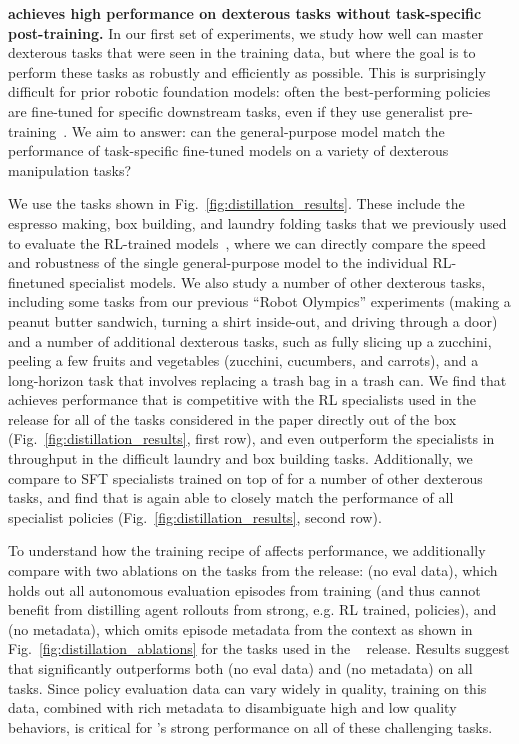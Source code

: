 
\label{sec:dexterity}

\noindent \textbf{\MethodName{} achieves high performance on dexterous tasks without task-specific post-training.}
In our first set of experiments, we study how well \MethodName{} can master dexterous tasks that were seen in the training data, but where the goal is to perform these tasks as robustly and efficiently as possible. This is surprisingly difficult for prior robotic foundation models: often the best-performing policies are fine-tuned for specific downstream tasks, even if they use generalist pre-training~\citep{pistar06, pi06model}. We aim to answer: can the general-purpose \MethodName{} model match the performance of task-specific fine-tuned models on a variety of dexterous manipulation tasks?

We use the tasks shown in Fig.~\ref{fig:distillation_results}. These include the espresso making, box building, and laundry folding tasks that we previously used to evaluate the RL-trained \Piszs{} models~\citep{pistar06}, where we can directly compare the speed and robustness of the single general-purpose \MethodName{} model to the individual RL-finetuned specialist \Piszs{} models. We also study a number of other dexterous tasks, including some tasks from our previous ``Robot Olympics'' experiments (making a peanut butter sandwich, turning a shirt inside-out, and driving through a door) and a number of additional dexterous tasks, such as fully slicing up a zucchini, peeling a few fruits and vegetables (zucchini, cucumbers, and carrots), and a long-horizon task that involves replacing a trash bag in a trash can. We find that \MethodName{} achieves performance that is competitive with the RL specialists used in the \Piszs{} release \citep{pistar06} for all of the tasks considered in the paper directly out of the box (Fig.~\ref{fig:distillation_results}, first row), and even outperform the specialists in throughput in the difficult laundry and box building tasks. Additionally, we compare \MethodName{} to SFT specialists trained on top of \Pizs{} for a number of other dexterous tasks, and find that \MethodName{} is again able to closely match the performance of all specialist policies (Fig.~\ref{fig:distillation_results}, second row).

To understand how the training recipe of \MethodName{} affects performance, we additionally compare \MethodName{} with two ablations on the tasks from the \Piszs{} release: \MethodName{} (no eval data), which holds out all autonomous evaluation episodes from training (and thus cannot benefit from distilling agent rollouts from strong, e.g. RL trained, policies), and \MethodName{} (no metadata), which omits episode metadata from the context as shown in Fig.~\ref{fig:distillation_ablations} for the tasks used in the \Piszs~ release. Results suggest that \MethodName{} significantly outperforms both \MethodName{} (no eval data) and \MethodName{} (no metadata) on all tasks. Since policy evaluation data can vary widely in quality, training on this data, combined with rich metadata to disambiguate high and low quality behaviors, is critical for \MethodName{}'s strong performance on all of these challenging tasks.


